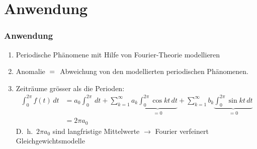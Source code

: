\section{Anwendung}
%
% 
%
\begin{frame}
\frametitle{Anwendung}
\begin{enumerate}[<+->]
\item
Periodische Phänomene mit Hilfe von Fourier-Theorie modellieren
\item
Anomalie $\mathstrut = \mathstrut$ Abweichung von den modellierten
periodischen Phänomenen.
\item
Zeiträume grösser als die Perioden:
\begin{align*}
\int_0^{2\pi}
f(t)\,dt
&=
a_0\int_0^{2\pi} \,dt
+
\sum_{k=1}^\infty a_k\underbrace{\int_0^{2\pi}\cos kt\,dt}_{\displaystyle=0}
+
\sum_{k=1}^\infty b_k\underbrace{\int_0^{2\pi}\sin kt\,dt}_{\displaystyle=0}
\\
&=
2\pi a_0
\end{align*}
D.~h.~$2\pi a_0$ sind langfristige Mittelwerte
$\rightarrow$ Fourier verfeinert Gleichgewichtsmodelle
\end{enumerate}
\end{frame}


